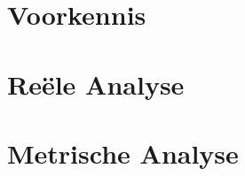 \documentclass[12pt,a4paper,oneside]{book}
\begin{document}


\tableofcontents

\part{Voorkennis}




\part{Re\"ele Analyse}







\part{Metrische Analyse}






\appendix



\nocite{aI}
\nocite{gelbaum2003counterexamples}



\printindex

\listoftodos
\end{document}

